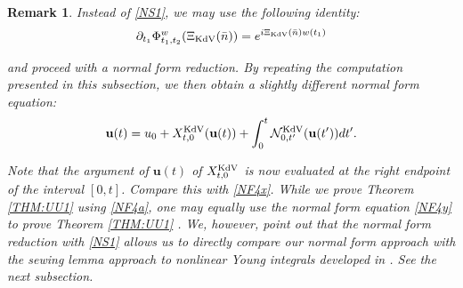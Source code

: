 \documentclass[letterpaper, 11pt,  reqno]{amsart}
\newtheorem{remark}[theorem]{Remark}
\newcommand{\1}{\hspace{0.5mm}\text{I}\hspace{0.5mm}}
\newcommand{\noi}{\noindent}
\newcommand{\dd}{\partial}
\newcommand{\NN}{\mathcal{N}}
\newcommand{\uu}{\mathbf{u}}
\newcommand{\KDV}{\text{\rm KdV} }
\numberwithin{equation}{section}
\numberwithin{theorem}{section}
\begin{document}
\begin{remark}\rm

Instead of \eqref{NS1}, we may use the following identity:
\begin{align*}
\dd_{t_1} \Phi^w_{t_1, t_2}(\Xi_\KDV (\bar n)) = e^{i \Xi_\KDV (\bar n)w(t_1)}
\end{align*}


\noi
and proceed with a normal form reduction.
By repeating the computation presented in this subsection, we
then obtain
a slightly different normal form equation:
\begin{align}
\begin{split}
\uu(t) 
 =  u_0 + 
 X^\KDV_{t, 0}(\uu (t) )
+ 
\int_0^t 
\NN^\KDV_{0, t'}(\uu(t'))dt'.
\end{split}
\label{NF4y}
\end{align}


\noi
Note that the argument of $\uu (t)$
of $X^\KDV_{t, 0}$ is now evaluated at the right endpoint of the interval
$[0, t]$.
Compare this with \eqref{NF4x}.
While we prove Theorem \ref{THM:UU1} 
using \eqref{NF4a}, 
one may equally use the normal form equation \eqref{NF4y}
to prove Theorem \ref{THM:UU1} .
We, however, point out that
the normal form reduction with \eqref{NS1}
allows us to directly compare our normal form approach 
with the sewing lemma approach to nonlinear Young integrals
developed in \cite{CGLLO1}.
See the next subsection.




\end{remark}
\end{document}
